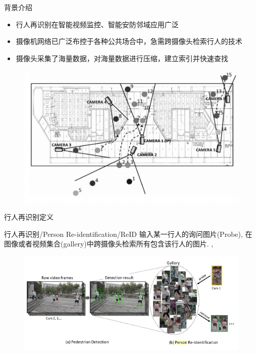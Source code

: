 \documentclass[notes]{beamer}
\newcommand{\hei}{\CJKfamily{hei}}
\begin{document}
\begin{frame}
	{背景介绍}
	\begin{itemize}
		\item 行人再识别在智能视频监控、智能安防邻域应用广泛
		\item 摄像机网络已广泛布控于各种公共场合中，急需{\hei 跨摄像头}检索行人的技术
		\item 摄像头采集了{\hei 海量}数据，对海量数据进行压缩，建立索引并快速查找
	\end{itemize}
	\begin{figure}
		\includegraphics[width=0.75\linewidth]{2018-03-07-19-33-13.png}
	\end{figure}
\end{frame}


\begin{frame}
	{行人再识别定义}
	\begin{block}{行人再识别/Person Re-identification/ReID}
	输入某一行人的询问图片(Probe), 在图像或者视频集合(gallery)中跨摄像头检索所有包含该行人的图片. \cite{zheng2016person},\cite{Zheng2017person}
	\end{block}
	\begin{figure}
		\includegraphics[width=0.9\linewidth]{2018-03-07-19-55-19.png}
	\end{figure}
\end{frame}
		
\end{document}
